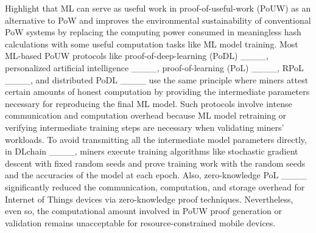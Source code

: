 Highlight that ML can serve as useful work in proof-of-useful-work
(PoUW) as an alternative to PoW and improves the environmental sustainability
of conventional PoW systems by replacing the computing power consumed
in meaningless hash calculations with some useful computation tasks
like ML model training. Most ML-based PoUW protocols like proof-of-deep-learning
(PoDL) ____, personalized artificial intelligence ____,
proof-of-learning (PoL) ____, RPoL ____,
and distributed PoDL ____ use the same principle where miners
attest certain amounts of honest computation by providing the intermediate
parameters necessary for reproducing the final ML model. Such protocols
involve intense communication and computation overhead because  ML
model retraining or verifying intermediate training steps are necessary
when validating miners' workloads. To avoid transmitting all the intermediate
model parameters directly, in DLchain ____, miners execute
training algorithms like stochastic gradient descent with fixed random
seeds and prove training work with the random seeds and the accuracies
of the model at each epoch.  Also, zero-knowledge PoL ____
significantly reduced the communication, computation, and storage
overhead for Internet of Things devices via zero-knowledge proof techniques.
Nevertheless, even  so, the computational amount involved in PoUW
proof generation or validation remains unacceptable  for resource-constrained
mobile devices.\vspace{-0.1cm}